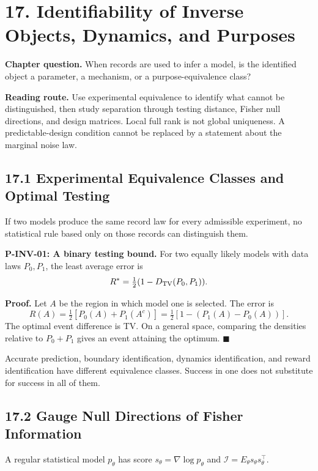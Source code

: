 \documentclass[
  english,
  11pt,
  oneside]{book}
\begin{document}
\chapter{17. Identifiability of Inverse Objects, Dynamics, and Purposes}\label{ch-17}

\textbf{Chapter question.} When records are used to infer a model, is the identified object a parameter, a mechanism, or a purpose-equivalence class?

\textbf{Reading route.} Use experimental equivalence to identify what cannot be distinguished, then study separation through testing distance, Fisher null directions, and design matrices. Local full rank is not global uniqueness. A predictable-design condition cannot be replaced by a statement about the marginal noise law.

\section{17.1 Experimental Equivalence Classes and Optimal Testing}\label{experimental-equivalence-classes-and-optimal-testing}

If two models produce the same record law for every admissible experiment, no statistical rule based only on those records can distinguish them.

\hypertarget{p-inv-01}{}\label{p-inv-01}

\textbf{P-INV-01: A binary testing bound.} For two equally likely models with data laws \(P_0,P_1\), the least average error is \[R^*=\tfrac12(1-D_{\rm TV}(P_0,P_1)).\]

\textbf{Proof.} Let \(A\) be the region in which model one is selected. The error is \[R(A)=\tfrac12[P_0(A)+P_1(A^c)]
=\tfrac12[1-(P_1(A)-P_0(A))].\] The optimal event difference is TV. On a general space, comparing the densities relative to \(P_0+P_1\) gives an event attaining the optimum. \(\blacksquare\)

Accurate prediction, boundary identification, dynamics identification, and reward identification have different equivalence classes. Success in one does not substitute for success in all of them.

\section{17.2 Gauge Null Directions of Fisher Information}\label{gauge-null-directions-of-fisher-information}

A regular statistical model \(p_\theta\) has score \(s_\theta=\nabla\log p_\theta\) and \(\mathcal I=E_\theta s_\theta s_\theta^\top\).
\end{document}
